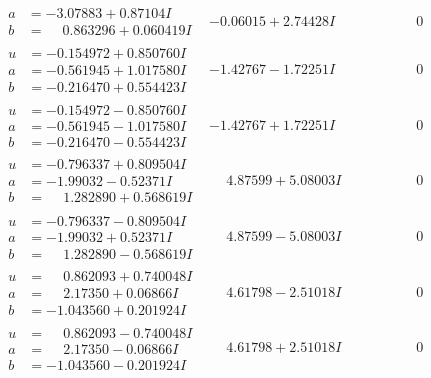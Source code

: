 \documentclass[1p]{elsarticle_modified}
\theoremstyle{definition}
\begin{document}
$$\begin{array}{c|c|c}
\begin{aligned}
a &= -3.07883 + 0.87104 I \\
b &= \phantom{-}0.863296 + 0.060419 I\end{aligned}
 & -0.06015 + 2.74428 I & \phantom{-0.000000 } 0 \\ \hline\begin{aligned}
u &= -0.154972 + 0.850760 I \\
a &= -0.561945 + 1.017580 I \\
b &= -0.216470 + 0.554423 I\end{aligned}
 & -1.42767 - 1.72251 I & \phantom{-0.000000 } 0 \\ \hline\begin{aligned}
u &= -0.154972 - 0.850760 I \\
a &= -0.561945 - 1.017580 I \\
b &= -0.216470 - 0.554423 I\end{aligned}
 & -1.42767 + 1.72251 I & \phantom{-0.000000 } 0 \\ \hline\begin{aligned}
u &= -0.796337 + 0.809504 I \\
a &= -1.99032 - 0.52371 I \\
b &= \phantom{-}1.282890 + 0.568619 I\end{aligned}
 & \phantom{-}4.87599 + 5.08003 I & \phantom{-0.000000 } 0 \\ \hline\begin{aligned}
u &= -0.796337 - 0.809504 I \\
a &= -1.99032 + 0.52371 I \\
b &= \phantom{-}1.282890 - 0.568619 I\end{aligned}
 & \phantom{-}4.87599 - 5.08003 I & \phantom{-0.000000 } 0 \\ \hline\begin{aligned}
u &= \phantom{-}0.862093 + 0.740048 I \\
a &= \phantom{-}2.17350 + 0.06866 I \\
b &= -1.043560 + 0.201924 I\end{aligned}
 & \phantom{-}4.61798 - 2.51018 I & \phantom{-0.000000 } 0 \\ \hline\begin{aligned}
u &= \phantom{-}0.862093 - 0.740048 I \\
a &= \phantom{-}2.17350 - 0.06866 I \\
b &= -1.043560 - 0.201924 I\end{aligned}
 & \phantom{-}4.61798 + 2.51018 I & \phantom{-0.000000 } 0 \\ \hline\begin{aligned}

\end{aligned}
\end{array}$$
\end{document}
